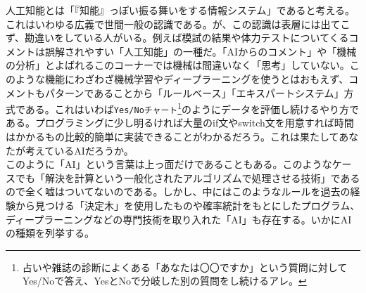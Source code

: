 \documentclass[a4paper]{ltjsreport}
\newcommand{\terlogy}[2][|]{\colorbox{terlogy}{\texttt{\lstinline#1#2#1}}}
\begin{document}
人工知能とは「『知能』っぽい振る舞いをする情報システム」であると考える。これはいわゆる広義で世間一般の認識である。が、この認識は表層には出てこず、勘違いをしている人がいる。例えば模試の結果や体力テストについてくるコメントは誤解されやすい「人工知能」の一種だ。「AIからのコメント」や「機械の分析」とよばれるこのコーナーでは機械は間違いなく「思考」していない。このような機能にわざわざ機械学習やディープラーニングを使うとはおもえず、コメントもパターンであることから「ルールベース」「エキスパートシステム」方式である。これはいわば\terlogy{Yes/Noチャート}\footnote{占いや雑誌の診断によくある「あなたは〇〇ですか」という質問に対してYes/Noで答え、YesとNoで分岐した別の質問をし続けるアレ。}のようにデータを評価し続けるやり方である。プログラミングに少し明るければ大量のif文やswitch文を用意すれば時間はかかるもの比較的簡単に実装できることがわかるだろう。これは果たしてあなたが考えているAIだろうか。
\\

このように「AI」という言葉は上っ面だけであることもある。このようなケースでも「解決を計算という一般化されたアルゴリズムで処理させる技術」であるので全く嘘はついてないのである。しかし、中にはこのようなルールを過去の経験から見つける「決定木」を使用したものや確率統計をもとにしたプログラム、ディープラーニングなどの専門技術を取り入れた「AI」も存在する。いかにAIの種類を列挙する。
\end{document}

